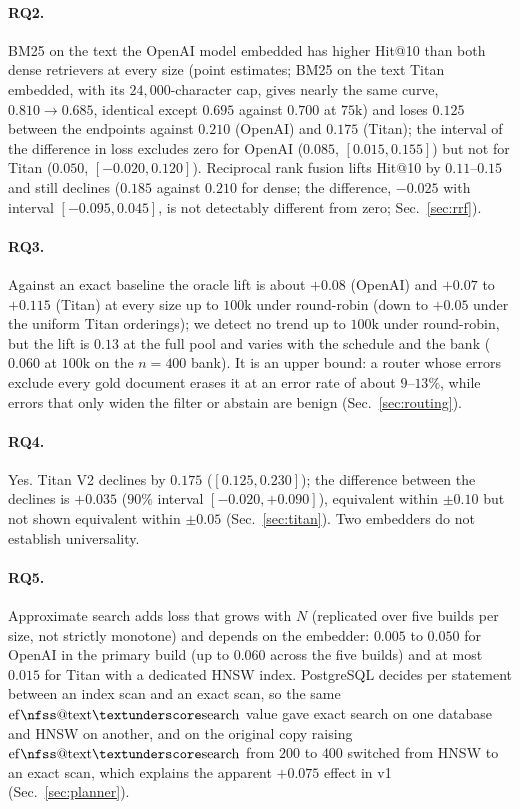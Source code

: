 \documentclass{ieeeaccess}
\makeatletter
\DeclareRobustCommand{\_}{\ifmmode\nfss@text{\textunderscore}\else\textunderscore\allowbreak\fi}
\makeatother
\begin{document}
\paragraph{RQ2.}
BM25 on the text the OpenAI model embedded has higher Hit@10 than both dense retrievers at every size (point estimates; BM25 on the text Titan embedded, with its $24{,}000$-character cap, gives nearly the same curve, $0.810{\to}0.685$, identical except $0.695$ against $0.700$ at $75\text{k}$) and loses $0.125$ between the endpoints against $0.210$ (OpenAI) and $0.175$ (Titan); the interval of the difference in loss excludes zero for OpenAI ($0.085$, $[0.015,0.155]$) but not for Titan ($0.050$, $[-0.020,0.120]$). Reciprocal rank fusion lifts Hit@10 by $0.11$--$0.15$ and still declines ($0.185$ against $0.210$ for dense; the difference, $-0.025$ with interval $[-0.095,0.045]$, is not detectably different from zero; Sec.~\ref{sec:rrf}).

\paragraph{RQ3.}
Against an exact baseline the oracle lift is about $+0.08$ (OpenAI) and $+0.07$ to $+0.115$ (Titan) at every size up to $100\text{k}$ under round-robin (down to $+0.05$ under the uniform Titan orderings); we detect no trend up to $100\text{k}$ under round-robin, but the lift is $0.13$ at the full pool and varies with the schedule and the bank ($0.060$ at $100\text{k}$ on the $n{=}400$ bank). It is an upper bound: a router whose errors exclude every gold document erases it at an error rate of about $9$--$13\%$, while errors that only widen the filter or abstain are benign (Sec.~\ref{sec:routing}).

\paragraph{RQ4.}
Yes. Titan V2 declines by $0.175$ ($[0.125,0.230]$); the difference between the declines is $+0.035$ ($90\%$ interval $[-0.020,+0.090]$), equivalent within $\pm0.10$ but not shown equivalent within $\pm0.05$ (Sec.~\ref{sec:titan}). Two embedders do not establish universality.

\paragraph{RQ5.}
Approximate search adds loss that grows with $N$ (replicated over five builds per size, not strictly monotone) and depends on the embedder: $0.005$ to $0.050$ for OpenAI in the primary build (up to $0.060$ across the five builds) and at most $0.015$ for Titan with a dedicated HNSW index. PostgreSQL decides per statement between an index scan and an exact scan, so the same $\mathrm{ef\_search}$ value gave exact search on one database and HNSW on another, and on the original copy raising $\mathrm{ef\_search}$ from $200$ to $400$ switched from HNSW to an exact scan, which explains the apparent $+0.075$ effect in v1 (Sec.~\ref{sec:planner}).
\end{document}
